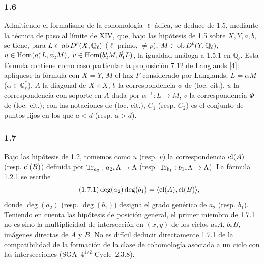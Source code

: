 \subsubsection*{1.6}
Admitiendo el formalismo de la cohomología $\ell$-ádica, se deduce de 1.5, mediante la técnica de paso al límite de XIV, que, bajo las hipótesis de 1.5 sobre $X,Y,a,b$, se tiene, para $L\in\operatorname{ob} D^b(X,\mathbb Q_\ell)$ ($\ell$ primo, $\ne p$), $M\in\operatorname{ob} D^b(Y,\mathbb Q_\ell)$, $u\in\operatorname{Hom}(a_1^*L,a_2^!M)$, $v\in\operatorname{Hom}(b_2^*M,b_1^!L)$, la igualdad análoga a 1.5.1 en $\mathbb Q_\ell$. Esta fórmula contiene como caso particular la proposición 7.12 de Langlands [4]: aplíquese la fórmula con $X=Y$, $M$ el haz $F$ considerado por Langlands; $L=\alpha M$ ($\alpha\in\mathbb Q_\ell^*$), $A$ la diagonal de $X\times X$, $b$ la correspondencia $\phi$ de (loc. cit.), $u$ la correspondencia con soporte en $A$ dada por $\alpha^{-1}:L\to M$, $v$ la correspondencia $\Phi$ de (loc. cit.); con las notaciones de (loc. cit.), $C_1$ (resp. $C_2$) es el conjunto de puntos fijos en los que $a<d$ (resp. $a>d$).

\subsubsection*{1.7}
Bajo las hipótesis de 1.2, tomemos como $u$ (resp. $v$) la correspondencia $\operatorname{cl}(A)$ (resp. $\operatorname{cl}(B)$) definida por $\operatorname{Tr}_{a_2}:a_{2*}\Lambda\to\Lambda$ (resp. $\operatorname{Tr}_{b_1}:b_{1*}\Lambda\to\Lambda$). La fórmula 1.2.1 se escribe
\begin{equation}\tag{1.7.1}
\deg(a_2)\deg(b_1)=\langle \operatorname{cl}(A),\operatorname{cl}(B)\rangle,
\end{equation}
donde $\deg(a_2)$ (resp. $\deg(b_1)$) designa el grado genérico de $a_2$ (resp. $b_1$). Teniendo en cuenta las hipótesis de posición general, el primer miembro de 1.7.1 no es sino la multiplicidad de intersección en $(x,y)$ de los ciclos $a_*A$, $b_*B$, imágenes directas de $A$ y $B$. No es difícil deducir directamente 1.7.1 de la compatibilidad de la formación de la clase de cohomología asociada a un ciclo con las intersecciones (SGA~$4^{1/2}$ Cycle~2.3.8).



